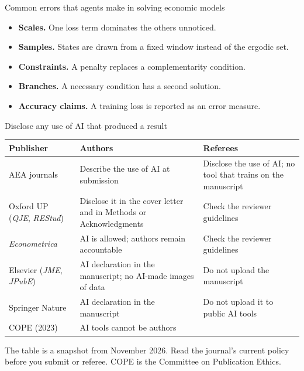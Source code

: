 \documentclass[aspectratio=169,10pt]{beamer}
\begin{document}
\begin{frame}{Common errors that agents make in solving economic models}
\begin{itemize}\itemsep11pt
  \item \textbf{Scales.} One loss term dominates the others unnoticed.
  \item \textbf{Samples.} States are drawn from a fixed window instead of the ergodic set.
  \item \textbf{Constraints.} A penalty replaces a complementarity condition.
  \item \textbf{Branches.} A necessary condition has a second solution.
  \item \textbf{Accuracy claims.} A training loss is reported as an error measure.
\end{itemize}
\end{frame}

\begin{frame}{Disclose any use of AI that produced a result}
\begin{center}
\small
\renewcommand{\arraystretch}{1.3}
\begin{tabular}{@{}>{\raggedright\arraybackslash}p{3.6cm} >{\raggedright\arraybackslash}p{5.2cm} >{\raggedright\arraybackslash}p{4.0cm}@{}}
\toprule
\textbf{Publisher} & \textbf{Authors} & \textbf{Referees} \\
\midrule
AEA journals & Describe the use of AI at submission & Disclose the use of AI; no tool that trains on the manuscript \\
Oxford UP (\textit{QJE}, \textit{REStud}) & Disclose it in the cover letter and in Methods or Acknowledgments & Check the reviewer guidelines \\
\textit{Econometrica} & AI is allowed; authors remain accountable & Check the reviewer guidelines \\
Elsevier (\textit{JME}, \textit{JPubE\/}) & AI declaration in the manuscript; no AI-made images of data & Do not upload the manuscript \\
Springer Nature & AI declaration in the manuscript & Do not upload it to public AI tools \\
COPE (2023) & AI tools cannot be authors & \\
\bottomrule
\end{tabular}
\end{center}
\vspace{-0.3em}
{\scriptsize\textcolor{uzhgreydark}{The table is a snapshot from November 2026. Read the journal's current policy before you submit or referee. COPE is the Committee on Publication Ethics.}}
\end{frame}
\end{document}
